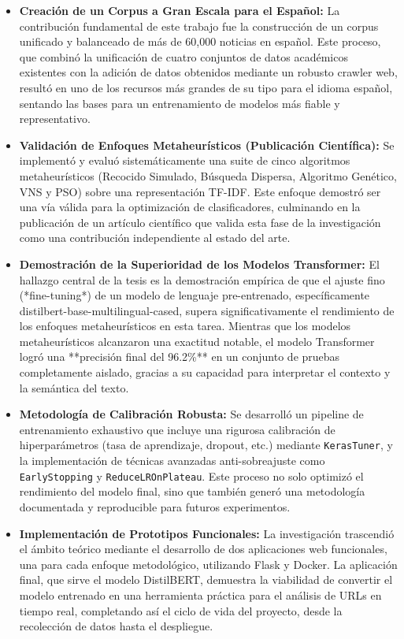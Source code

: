 \begin{itemize}
    \item \textbf{Creación de un Corpus a Gran Escala para el Español:} La contribución fundamental de este trabajo fue la construcción de un corpus unificado y balanceado de más de 60,000 noticias en español. Este proceso, que combinó la unificación de cuatro conjuntos de datos académicos existentes con la adición de datos obtenidos mediante un robusto crawler web, resultó en uno de los recursos más grandes de su tipo para el idioma español, sentando las bases para un entrenamiento de modelos más fiable y representativo.

    \item \textbf{Validación de Enfoques Metaheurísticos (Publicación Científica):} Se implementó y evaluó sistemáticamente una suite de cinco algoritmos metaheurísticos (Recocido Simulado, Búsqueda Dispersa, Algoritmo Genético, VNS y PSO) sobre una representación TF-IDF. Este enfoque demostró ser una vía válida para la optimización de clasificadores, culminando en la publicación de un artículo científico que valida esta fase de la investigación como una contribución independiente al estado del arte.

    \item \textbf{Demostración de la Superioridad de los Modelos Transformer:} El hallazgo central de la tesis es la demostración empírica de que el ajuste fino (*fine-tuning*) de un modelo de lenguaje pre-entrenado, específicamente distilbert-base-multilingual-cased, supera significativamente el rendimiento de los enfoques metaheurísticos en esta tarea. Mientras que los modelos metaheurísticos alcanzaron una exactitud notable, el modelo Transformer logró una **precisión final del 96.2\%** en un conjunto de pruebas completamente aislado, gracias a su capacidad para interpretar el contexto y la semántica del texto.

    \item \textbf{Metodología de Calibración Robusta:} Se desarrolló un pipeline de entrenamiento exhaustivo que incluye una rigurosa calibración de hiperparámetros (tasa de aprendizaje, dropout, etc.) mediante \texttt{KerasTuner}, y la implementación de técnicas avanzadas anti-sobreajuste como \texttt{EarlyStopping} y \texttt{ReduceLROnPlateau}. Este proceso no solo optimizó el rendimiento del modelo final, sino que también generó una metodología documentada y reproducible para futuros experimentos.

    \item \textbf{Implementación de Prototipos Funcionales:} La investigación trascendió el ámbito teórico mediante el desarrollo de dos aplicaciones web funcionales, una para cada enfoque metodológico, utilizando Flask y Docker. La aplicación final, que sirve el modelo DistilBERT, demuestra la viabilidad de convertir el modelo entrenado en una herramienta práctica para el análisis de URLs en tiempo real, completando así el ciclo de vida del proyecto, desde la recolección de datos hasta el despliegue.
\end{itemize}

